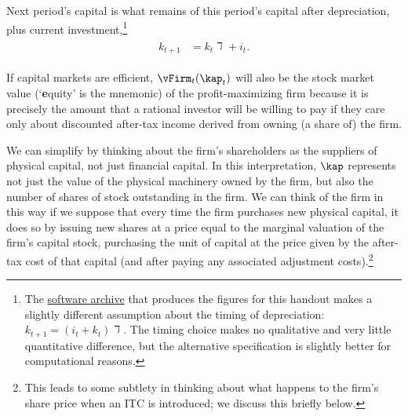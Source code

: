 \documentclass[headings=optiontotocandhead,toc=flat]{handout}
\begin{document}
Next period's capital is what remains of this period's capital after depreciation,
plus current investment,\footnote{The \href{\darkolo}{software archive} that produces the figures for this
  handout makes a slightly different assumption about the timing of depreciation: $k_{t+1} = (i_{t}+k_{t})\daleth.$  The timing choice makes no qualitative and very little quantitative difference, but the
  alternative specification is slightly better for computational reasons.}
\begin{equation}\begin{gathered}\begin{aligned}
      k_{t+1} & =  k_{t}\daleth+i_{t}.
    \end{aligned}\end{gathered}\end{equation}

If capital markets are efficient, $\vFirm_{t}(\kap_{t})$ will also be the stock market value (`\textbf{e}quity' is the mnemonic) of the profit-maximizing firm because it is precisely the amount that a rational investor will be willing to pay if they care only about discounted after-tax income derived from owning (a share of) the firm.

We can simplify by thinking about the firm's shareholders as the suppliers of physical capital, not just financial capital.  In this interpretation, $\kap$ represents not just the value of the physical machinery owned by the firm, but also the number of shares of stock outstanding in the firm.  We can think of the firm in this way if we suppose that every time the firm purchases new physical capital, it does so by issuing new shares at a price equal to the marginal valuation of the firm's capital stock, purchasing the unit of capital at the price given by the after-tax cost of that capital (and after paying any associated adjustment costs).\footnote{This leads to some subtlety in thinking about what happens to the firm's share price when an ITC is introduced; we discuss this briefly below.}
\end{document}

